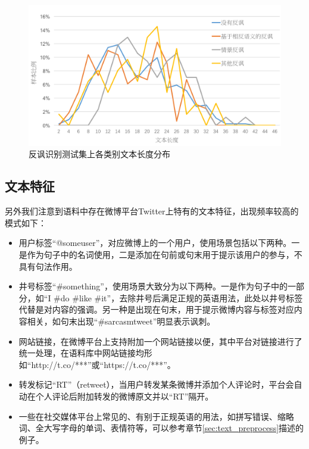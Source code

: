 \begin{figure}[H]
  \centering
  \includegraphics[width=\textwidth]{img/semeval2018_task3_test_class_len.png}
  \caption{反讽识别测试集上各类别文本长度分布}
  \label{fig:semeval2018_task3_test_class_len}
\end{figure}

\subsection{文本特征}
\label{ssec:exp_irony_det_data_text}

另外我们注意到语料中存在微博平台Twitter上特有的文本特征，出现频率较高的模式如下：

\begin{itemize}

\item 用户标签“@someuser”，对应微博上的一个用户，使用场景包括以下两种。一是作为句子中的名词使用，二是添加在句前或句末用于提示该用户的参与，不具有句法作用。

\item 井号标签“\#something”，使用场景大致分为以下两种。一是作为句子中的一部分，如“I \#do \#like \#it”，去除井号后满足正规的英语用法，此处以井号标签代替是对内容的强调。另一种是出现在句末，用于提示微博内容与标签对应内容相关，如句末出现“\#sarcasmtweet”明显表示讽刺。

\item 网站链接，在微博平台上支持附加一个网站链接以便，其中平台对链接进行了统一处理，在语料库中网站链接均形如“http://t.co/***”或“https://t.co/***”。

\item 转发标记“RT”（retweet），当用户转发某条微博并添加个人评论时，平台会自动在个人评论后附加转发的微博原文并以“RT”隔开。

\item 一些在社交媒体平台上常见的、有别于正规英语的用法，如拼写错误、缩略词、全大写字母的单词、表情符等，可以参考章节\ref{sec:text_preprocess}描述的例子。

\end{itemize}



